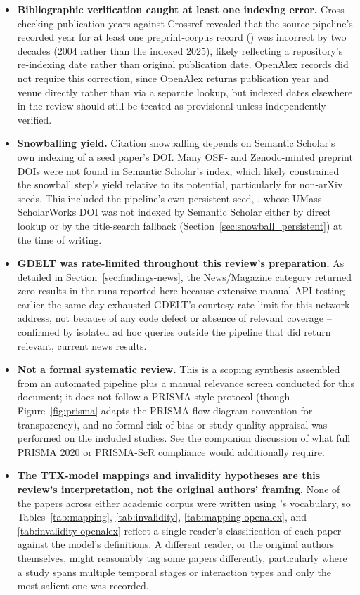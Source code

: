 \documentclass[11pt]{article}
\begin{document}
\begin{itemize}[leftmargin=*]
    \item \textbf{Bibliographic verification caught at least one indexing error.} Cross-checking publication years against Crossref revealed that the source pipeline's recorded year for at least one preprint-corpus record (\citet{reese2004teachersperceptions}) was incorrect by two decades (2004 rather than the indexed 2025), likely reflecting a repository's re-indexing date rather than original publication date. OpenAlex records did not require this correction, since OpenAlex returns publication year and venue directly rather than via a separate lookup, but indexed dates elsewhere in the review should still be treated as provisional unless independently verified.
    \item \textbf{Snowballing yield.} Citation snowballing depends on Semantic Scholar's own indexing of a seed paper's DOI. Many OSF- and Zenodo-minted preprint DOIs were not found in Semantic Scholar's index, which likely constrained the snowball step's yield relative to its potential, particularly for non-arXiv seeds. This included the pipeline's own persistent seed, \citet{araneda2023dissertation}, whose UMass ScholarWorks DOI was not indexed by Semantic Scholar either by direct lookup or by the title-search fallback (Section~\ref{sec:snowball_persistent}) at the time of writing.
    \item \textbf{GDELT was rate-limited throughout this review's preparation.} As detailed in Section~\ref{sec:findings-news}, the News/Magazine category returned zero results in the runs reported here because extensive manual API testing earlier the same day exhausted GDELT's courtesy rate limit for this network address, not because of any code defect or absence of relevant coverage -- confirmed by isolated ad hoc queries outside the pipeline that did return relevant, current news results.
    \item \textbf{Not a formal systematic review.} This is a scoping synthesis assembled from an automated pipeline plus a manual relevance screen conducted for this document; it does not follow a PRISMA-style protocol (though Figure~\ref{fig:prisma} adapts the PRISMA flow-diagram convention for transparency), and no formal risk-of-bias or study-quality appraisal was performed on the included studies. See the companion discussion of what full PRISMA 2020 or PRISMA-ScR compliance would additionally require.
    \item \textbf{The TTX-model mappings and invalidity hypotheses are this review's interpretation, not the original authors' framing.} None of the papers across either academic corpus were written using \citeauthor{araneda2025ttxmodel}'s vocabulary, so Tables~\ref{tab:mapping}, \ref{tab:invalidity}, \ref{tab:mapping-openalex}, and \ref{tab:invalidity-openalex} reflect a single reader's classification of each paper against the model's definitions. A different reader, or the original authors themselves, might reasonably tag some papers differently, particularly where a study spans multiple temporal stages or interaction types and only the most salient one was recorded.
\end{itemize}
\end{document}
